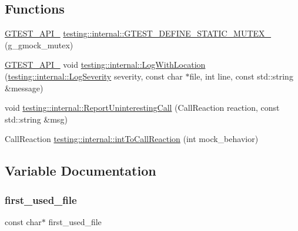 \subsection*{Functions}
\begin{DoxyCompactItemize}
\item 
\mbox{\hyperlink{_obj__test_2lib_2googletest-release-1_88_81_2googletest_2include_2gtest_2internal_2gtest-port_8h_aa73be6f0ba4a7456180a94904ce17790}{G\+T\+E\+S\+T\+\_\+\+A\+P\+I\+\_\+}} \mbox{\hyperlink{namespacetesting_1_1internal_a8c4aa7be8daa7b60e293071d70a89584}{testing\+::internal\+::\+G\+T\+E\+S\+T\+\_\+\+D\+E\+F\+I\+N\+E\+\_\+\+S\+T\+A\+T\+I\+C\+\_\+\+M\+U\+T\+E\+X\+\_\+}} (g\+\_\+gmock\+\_\+mutex)
\item 
\mbox{\hyperlink{_obj__test_2lib_2googletest-release-1_88_81_2googletest_2include_2gtest_2internal_2gtest-port_8h_aa73be6f0ba4a7456180a94904ce17790}{G\+T\+E\+S\+T\+\_\+\+A\+P\+I\+\_\+}} void \mbox{\hyperlink{namespacetesting_1_1internal_a07f4411f23f8b1b731858be9dda3fdcc}{testing\+::internal\+::\+Log\+With\+Location}} (\mbox{\hyperlink{namespacetesting_1_1internal_a203d1a8a2147a53d12bbdae40d443914}{testing\+::internal\+::\+Log\+Severity}} severity, const char $\ast$file, int line, const std\+::string \&message)
\item 
void \mbox{\hyperlink{namespacetesting_1_1internal_af045b703d8487374620a8106a76814ee}{testing\+::internal\+::\+Report\+Uninteresting\+Call}} (Call\+Reaction reaction, const std\+::string \&msg)
\item 
Call\+Reaction \mbox{\hyperlink{namespacetesting_1_1internal_a55ce2ee38c64db1a89feae3751439620}{testing\+::internal\+::int\+To\+Call\+Reaction}} (int mock\+\_\+behavior)
\end{DoxyCompactItemize}


\subsection{Variable Documentation}
\mbox{\label{_obj__test_2lib_2googletest-release-1_88_81_2googlemock_2src_2gmock-spec-builders_8cc_a8eedfa563d9488da77e2972262a6adda}} 
\subsubsection{\texorpdfstring{first\_used\_file}{first\_used\_file}}
{\footnotesize\ttfamily const char$\ast$ first\+\_\+used\+\_\+file}

